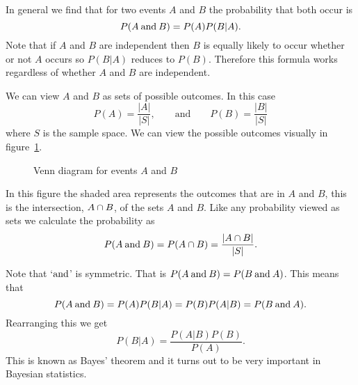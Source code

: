     In general we find that for two events \(A\) and \(B\) the probability that both occur is
    \[P(A\mathbin{\operatorname{and}} B) = P(A)P(B|A).\]
    Note that if \(A\) and \(B\) are independent then \(B\) is equally likely to occur whether or not \(A\) occurs so \(P(B|A)\) reduces to \(P(B)\).
    Therefore this formula works regardless of whether \(A\) and \(B\) are independent.
    
    We can view \(A\) and \(B\) as sets of possible outcomes.
    In this case
    \[P(A) = \frac{|A|}{|S|},\qquad\text{and}\qquad P(B) = \frac{|B|}{|S|}\]
    where \(S\) is the sample space.
    We can view the possible outcomes visually in figure~\ref{fig:venn diagram for events A and B}.
    \begin{figure}[ht]
        \centering
        \caption{Venn diagram for events \(A\) and \(B\)}
        \label{fig:venn diagram for events A and B}
    \end{figure}
    In this figure the shaded area represents the outcomes that are in \(A\) and \(B\), this is the intersection, \(A\cap B\), of the sets \(A\) and \(B\).
    Like any probability viewed as sets we calculate the probability as
    \[P(A\mathbin{\operatorname{and}} B) = P(A\cap B) = \frac{|A\cap B|}{|S|}.\]
    
    Note that `\(\mathbin{\operatorname{and}}\)' is symmetric.
    That is \(P(A\mathbin{\operatorname{and}} B) = P(B\mathbin{\operatorname{and}} A)\).
    This means that
    \[P(A\mathbin{\operatorname{and}} B) = P(A)P(B|A) = P(B)P(A|B) = P(B\mathbin{\operatorname{and}} A).\]
    Rearranging this we get
    \[P(B|A) = \frac{P(A|B)P(B)}{P(A)}.\]
    This is known as Bayes' theorem and it turns out to be very important in Bayesian statistics.
    
